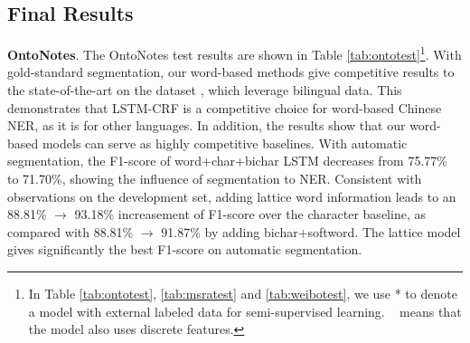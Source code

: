 \documentclass[11pt,a4paper]{article}
\begin{document}
\begin{CJK*}{UTF8}{gbsn}
\subsection{Final Results}
\textbf{OntoNotes}. The OntoNotes test results are shown in Table \ref{tab:ontotest}\footnote{In Table \ref{tab:ontotest}, \ref{tab:msratest} and \ref{tab:weibotest}, we use * to denote a model with external labeled data for semi-supervised learning. \dag ~ means that the model also uses discrete features.}. With gold-standard segmentation, our word-based methods give competitive results to the state-of-the-art on the dataset \cite{che2013named,wang2013effective}, which leverage bilingual data. This demonstrates that LSTM-CRF is a competitive choice for word-based Chinese NER, as it is for other languages. In addition, the results show that our word-based models can serve as highly competitive baselines. With automatic segmentation, the F1-score of word+char+bichar LSTM decreases from 75.77\% to 71.70\%, showing the influence of segmentation to NER. Consistent with observations on the development set, adding lattice word information leads to an 88.81\% $\rightarrow$ 93.18\% increasement of F1-score over the character baseline, as compared with 88.81\% $\rightarrow$ 91.87\% by adding bichar+softword. The lattice model gives significantly the best F1-score on automatic segmentation. 

\begin{table}[!tp]
\begin{center}
\end{center}
\caption{Main results on MSRA.}
\label{tab:msratest}
\end{table}


\end{CJK*}
\end{document}
